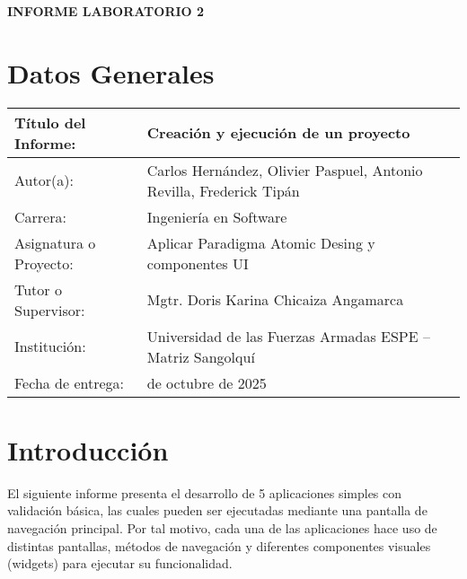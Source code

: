 \documentclass[12pt,letterpaper]{article}
\begin{document}
\renewcommand{\figurename}{Ilustración} 
{\textbf{\textcolor{azulOscuro}{INFORME LABORATORIO 2}}}


{\setlength{\parskip}{0pt}
\section{Datos Generales}
}

\begin{tabularx}{\textwidth}{|>{\raggedright\arraybackslash}X|>{\raggedright\arraybackslash}X|}
\hline
Título del Informe: & Creación y ejecución de un proyecto \\
\hline
Autor(a): & Carlos Hernández, Olivier Paspuel, Antonio Revilla, Frederick Tipán\\
\hline
Carrera: & Ingeniería en Software \\
\hline
Asignatura o Proyecto: & Aplicar Paradigma Atomic Desing y componentes UI \\
\hline
Tutor o Supervisor: & Mgtr. Doris Karina Chicaiza Angamarca\\
\hline
Institución: & Universidad de las Fuerzas Armadas ESPE – Matriz Sangolquí \\
\hline
Fecha de entrega: & 31 de octubre de 2025 \\
\hline
\end{tabularx}



\section{Introducción}

El siguiente informe presenta el desarrollo de 5 aplicaciones simples con validación básica, las cuales pueden ser ejecutadas mediante una pantalla de navegación principal. Por tal motivo, cada una de las aplicaciones hace uso de distintas pantallas, métodos de navegación y diferentes componentes visuales (widgets) para ejecutar su funcionalidad.
\end{document}
